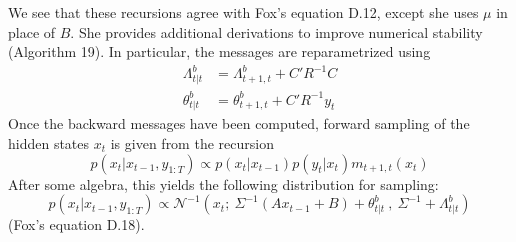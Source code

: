 \documentclass[12pt]{article}
\begin{document}
We see that these recursions agree with Fox's equation D.12, except she uses $\mu$ in place of $B$. She provides additional derivations to improve numerical stability (Algorithm 19). In particular, the messages are reparametrized using
\begin{align*}
\Lambda^b_{t|t} &= \Lambda^b_{t+1,t} + C'R^{-1}C\\
\theta^b_{t|t} &= \theta^b_{t+1,t} + C'R^{-1}y_t
\end{align*}
Once the backward messages have been computed, forward sampling of the hidden states $x_t$ is given from the recursion
\[p(x_t|x_{t-1},y_{1:T}) \propto p(x_t|x_{t-1})p(y_t|x_t)m_{t+1,t}(x_t)\]
After some algebra, this yields the following distribution for sampling:
\[p(x_t|x_{t-1},y_{1:T}) \propto \mathcal{N}^{-1}(x_t;~\Sigma^{-1}(Ax_{t-1}+B)+\theta^b_{t|t}~,~\Sigma^{-1}+\Lambda^b_{t|t})\]
(Fox's equation D.18).
\end{document}
